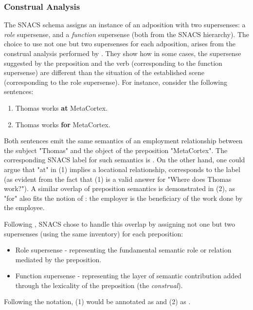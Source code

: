 \subsubsection{Construal Analysis} \label{sec:construal}

The SNACS schema assigns an instance of an adposition with two supersenses: a \textit{role} supersense, and a \textit{function} supersense (both from the SNACS hierarchy). The choice to use not one but two supersenses for each adposition, arises from the construal analysis performed by \cite{hwang-17}. They show how in some cases, the supersense suggested by the preposition and the verb (corresponding to the function supersense) are different than the situation of the established scene (corresponding to the role supersense). For instance, consider the following sentences:

\begin{enumerate}
    \item Thomas works \textbf{at} MetaCortex.
    \item Thomas works \textbf{for} MetaCortex.
\end{enumerate}

Both sentences emit the same semantics of an employment relationship between the subject "Thomas" and the object of the preposition "MetaCortex". The corresponding SNACS label for such semantics is . On the other hand, one could argue that "at" in (1) implies a locational relationship, corresponds to the  label (as evident from the fact that (1) is a valid answer for "Where does Thomas work?"). A similar overlap of preposition semantics is demonstrated in (2), as "for" also fits the notion of : the employer is the beneficiary of the work done by the employee. 

Following \cite{hwang-17}, SNACS chose to handle this overlap by assigning not one but two supersenses (using the same inventory) for each preposition:

\begin{itemize}
    \item Role supersense - representing the fundamental semantic role or relation mediated by the preposition.
    \item Function supersense - representing the layer of semantic contribution added through the lexicality of the preposition (the \textit{construal}).
\end{itemize}

Following the  notation, (1) would be annotated as  and (2) as .


